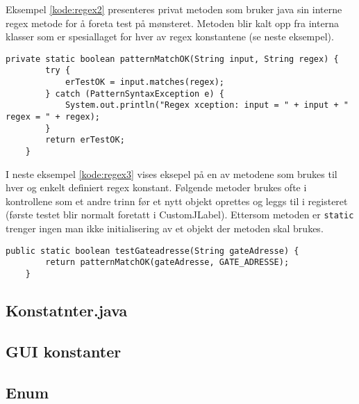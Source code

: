Eksempel \ref{kode:regex2} presenteres privat metoden som bruker java
sin interne regex metode for å foreta test på mønsteret. Metoden blir kalt opp fra interna klasser som er spesiallaget for hver av regex konstantene (se neste eksempel).

\begin{lstlisting}[caption=Private regex test metode., label=kode:regex2]
	private static boolean patternMatchOK(String input, String regex) {
        try {
            erTestOK = input.matches(regex);
        } catch (PatternSyntaxException e) {
            System.out.println("Regex xception: input = " + input + " regex = " + regex);
        }
        return erTestOK;
  	}
\end{lstlisting}


I neste eksempel \ref{kode:regex3} vises eksepel på en av metodene som brukes til hver og enkelt definiert regex konstant. Følgende metoder brukes ofte i kontrollene som et andre trinn før et nytt objekt oprettes og leggs til i registeret (første testet blir normalt foretatt i CustomJLabel). Ettersom metoden er \texttt{static} trenger ingen man ikke initialisering av et objekt der metoden skal brukes. 


\begin{lstlisting}[caption=Static regex metode til tilhørende regex møsnter streng., label=kode:regex3]
    public static boolean testGateadresse(String gateAdresse) {
        return patternMatchOK(gateAdresse, GATE_ADRESSE);
    }
\end{lstlisting}


\subsection{Konstatnter.java}

\subsection{GUI konstanter}

\subsection{Enum}
